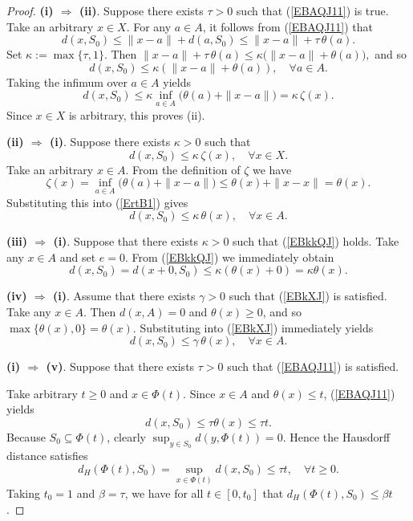 \documentclass[10pt,a4paper]{amsart}
\begin{document}
\begin{proof}
	\noindent\textbf{(i) $\Rightarrow$ (ii)}.
	Suppose there exists \(\tau > 0\) such that   (\ref{EBAQJ11}) is true.
	Take an arbitrary \(x \in X\). For any \(a \in A\),   it follows from  (\ref{EBAQJ11})  that
	\[
	d(x, S_0) \le \|x - a\| + d(a, S_0) \le \|x - a\| + \tau \, \theta(a).
	\]
	Set \(\kappa := \max\{\tau, 1\}\). Then  
	$  \|x - a\| + \tau \, \theta(a) \le \kappa \bigl( \|x - a\| + \theta(a) \bigr),$  and so
	$$d(x, S_0) \le \kappa (\|x - a\| + \theta(a)),  \quad  \forall a \in A.  $$
	Taking the infimum over \(a \in A\) yields  
	\[
	d(x, S_0) \le \kappa \inf_{a \in A} \bigl( \theta(a) + \|x - a\| \bigr) = \kappa \, \zeta(x).
	\]
	Since \(x \in X\) is arbitrary, this proves (ii).
	
	
	\noindent\textbf{(ii) $\Rightarrow$ (i)}.
	Suppose there exists \(\kappa > 0\) such that 
	\begin{equation}\label{ErtB1}
		d(x, S_0) \le \kappa \, \zeta(x), \quad  \forall x \in X.
	\end{equation}
	Take an arbitrary \(x \in A\). From the definition of \(\zeta\) we have  
	\[
	\zeta(x) = \inf_{a \in A} \bigl( \theta(a) + \|x - a\| \bigr) \le \theta(x) + \|x - x\| = \theta(x).
	\]
	Substituting this into    (\ref{ErtB1})   gives  
	\[
	d(x, S_0) \le \kappa \, \theta(x), \quad \forall x \in A.
	\]
	
	\noindent\textbf{(iii) $\Rightarrow$ (i)}.
	Suppose  that there exists \(\kappa > 0\) such that  (\ref{EBkkQJ}) holds.   
	Take any \(x \in A\) and set \(e = 0\). From (\ref{EBkkQJ}) we immediately obtain
	\[
	d(x, S_0) = d(x+0, S_0) \le \kappa (\theta(x) + 0) = \kappa \theta(x).
	\]
	
	
	\noindent\textbf{(iv) $\Rightarrow$ (i)}.
	Assume that  there exists $\gamma>0$ such that (\ref{EBkXJ}) is satisfied.
	Take any $x\in A$. Then $d(x, A)=0$  and   $\theta(x)\ge0$, and so $\max\{\theta(x),0\}=\theta(x)$. Substituting into (\ref{EBkXJ}) immediately yields
	\[
	d(x,S_0)\le \gamma\,\theta(x),\quad \forall x\in A.
	\]
	
	
	
	\noindent\textbf{(i) $\Rightarrow$ (v)}.
	Suppose that  there exists \(\tau > 0\) such that   (\ref{EBAQJ11})  is satisfied.
	
	Take arbitrary \(t \ge 0\) and \(x \in \Phi(t)\). Since \(x \in A\) and \(\theta(x) \le t\),   (\ref{EBAQJ11})  yields
	\[
	d(x, S_0) \le \tau \theta(x) \le \tau t.
	\]
	Because \(S_0 \subseteq \Phi(t)\), clearly \(\sup_{y \in S_0} d(y, \Phi(t)) = 0\). Hence the Hausdorff distance satisfies
	\[
	d_H(\Phi(t), S_0) = \sup_{x \in \Phi(t)} d(x, S_0) \le \tau t, \quad \forall t \ge 0.
	\]
	Taking \(t_0 = 1\) and \(\beta = \tau\), we have for all \(t \in [0, t_0]\) that \(d_H(\Phi(t), S_0) \le \beta t\). 	 		
	

\end{proof}
\end{document}
